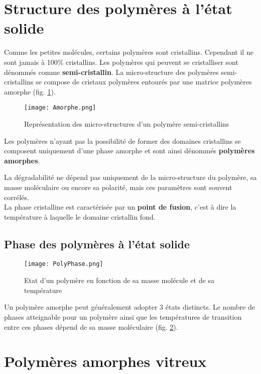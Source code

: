\documentclass[../main.tex]{subfiles}
\begin{document}
	\section{Structure des polymères à l'état solide}
	Comme les petites molécules, certains polymères sont cristallins. Cependant il ne sont jamais à 100\% cristallins. Les polymères qui peuvent se cristalliser sont dénommés comme \textbf{semi-cristallin}. La micro-structure des polymères semi-cristallins se compose de cristaux polymères entourés par une matrice polymères amorphe (fig. \ref{amorphe}). 
	\begin{figure}[h]
		\begin{center}
			\texttt{[image: Amorphe.png]}
			\caption{\label{amorphe}Représentation des micro-structures d'un polymère semi-cristallins}
		\end{center}
	\end{figure}
	Les polymères n'ayant pas la possibilité de former des domaines cristallins se composent uniquement d'une phase amorphe et sont ainsi dénommés \textbf{polymères amorphes}.
	
	La dégradabilité ne dépend pas uniquement de la micro-structure du polymère, sa masse moléculaire ou encore sa polarité, mais ces paramètres sont souvent corrélés.
	\\
	La phase cristalline est caractérisée par un \textbf{point de fusion}, c'est à dire la température à laquelle le domaine cristallin fond. 
	
	\subsection{Phase des polymères à l'état solide}
	
	\begin{figure}[h]
		\begin{center}
			\texttt{[image: PolyPhase.png]}
			\caption{\label{polyphase}Etat d'un polymère en fonction de sa masse molécule et de sa température}
		\end{center}
	\end{figure}

	Un polymère amorphe peut généralement adopter 3 états distincts. Le nombre de phases atteignable pour un polymère ainsi que les températures de transition entre ces phases dépend de sa masse moléculaire (fig. \ref{polyphase}). 
	
	\section{Polymères amorphes vitreux}
	
\end{document}
